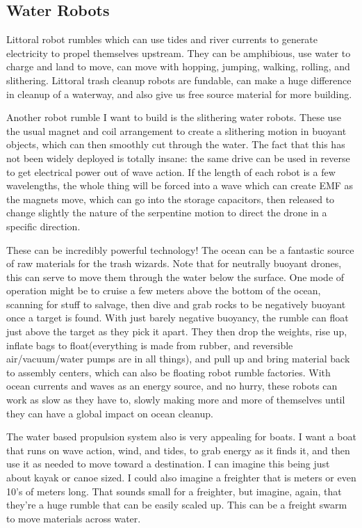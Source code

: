 \subsection{Water Robots}\label{water-robots}

Littoral robot rumbles which can use tides and river currents to
generate electricity to propel themselves upstream. They can be
amphibious, use water to charge and land to move, can move with hopping,
jumping, walking, rolling, and slithering. Littoral trash cleanup robots
are fundable, can make a huge difference in cleanup of a waterway, and
also give us free source material for more building.

Another robot rumble I want to build is the slithering water robots.
These use the usual magnet and coil arrangement to create a slithering
motion in buoyant objects, which can then smoothly cut through the
water. The fact that this has not been widely deployed is totally
insane: the same drive can be used in reverse to get electrical power
out of wave action. If the length of each robot is a few wavelengths,
the whole thing will be forced into a wave which can create EMF as the
magnets move, which can go into the storage capacitors, then released to
change slightly the nature of the serpentine motion to direct the drone
in a specific direction.

These can be incredibly powerful technology! The ocean can be a
fantastic source of raw materials for the trash wizards. Note that for
neutrally buoyant drones, this can serve to move them through the water
below the surface. One mode of operation might be to cruise a few meters
above the bottom of the ocean, scanning for stuff to salvage, then dive
and grab rocks to be negatively buoyant once a target is found. With
just barely negative buoyancy, the rumble can float just above the
target as they pick it apart. They then drop the weights, rise up,
inflate bags to float(everything is made from rubber, and reversible
air/vacuum/water pumps are in all things), and pull up and bring
material back to assembly centers, which can also be floating robot
rumble factories. With ocean currents and waves as an energy source, and
no hurry, these robots can work as slow as they have to, slowly making
more and more of themselves until they can have a global impact on ocean
cleanup.

The water based propulsion system also is very appealing for boats. I
want a boat that runs on wave action, wind, and tides, to grab energy as
it finds it, and then use it as needed to move toward a destination. I
can imagine this being just about kayak or canoe sized. I could also
imagine a freighter that is meters or even 10's of meters long. That
sounds small for a freighter, but imagine, again, that they're a huge
rumble that can be easily scaled up. This can be a freight swarm to move
materials across water.


